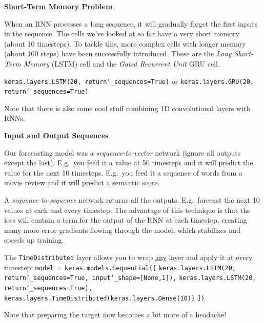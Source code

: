 \textbf{\underline{Short-Term Memory Problem}}

When an RNN processes a long sequence, it will gradually forget the first inputs in the sequence.
The cells we've looked at so far have a very short memory (about 10 timesteps).
To tackle this, more complex cells with longer memory (about 100 steps) have been successfully introduced.
These are the \textit{Long Short-Term Memory} (LSTM) cell and the \textit{Gated Recurrent Unit} GRU cell.

\texttt{keras.layers.LSTM(20, return\char`_sequences=True)}\newline
or\newline
\texttt{keras.layers.GRU(20, return\char`_sequences=True)}

Note that there is also some cool stuff combining 1D convolutional layers with RNNs.

\newpage

\textbf{\underline{Input and Output Sequences}}

Our forecasting model was a \textit{sequence-to-vector} network (ignore all outputs except the last).
% 
E.g.~you feed it a value at 50 timesteps and it will predict the value for the next 10 timesteps.\newline
E.g.~you feed it a sequence of words from a movie review and it will predict a semantic score.

A \textit{sequence-to-sequence} network returns all the outputs.\newline
E.g.~forecast the next 10 values at each and every timestep.
The advantage of this technique is that the loss will contain a term for the output of the RNN at each timestep,
creating many more error gradients flowing through the model,
which stabilizes and speeds up training.

The \texttt{TimeDistributed} layer allows you to wrap \underline{any} layer and apply it at every timestep:\newline
\texttt{model = keras.models.Sequential([}\newline
\texttt{keras.layers.LSTM(20, return\char`_sequences=True, input\char`_shape=[None,1]),}\newline
\texttt{keras.layers.LSTM(20, return\char`_sequences=True),}\newline
\texttt{keras.layers.TimeDistributed(keras.layers.Dense(10))}\newline
\texttt{])}

Note that preparing the target now becomes a bit more of a headache!

